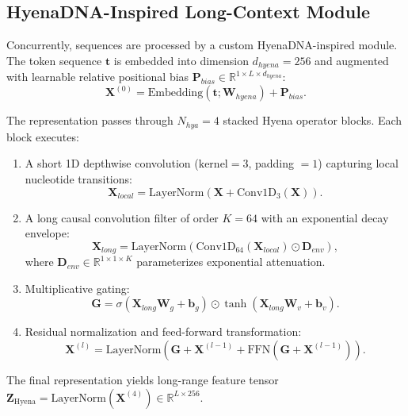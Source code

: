 \documentclass[conference]{IEEEtran}
\begin{document}
\subsection{HyenaDNA-Inspired Long-Context Module}
Concurrently, sequences are processed by a custom HyenaDNA-inspired module. The token sequence $\mathbf{t}$ is embedded into dimension $d_{hyena} = 256$ and augmented with learnable relative positional bias $\mathbf{P}_{bias} \in \mathbb{R}^{1 \times L \times d_{hyena}}$:
\begin{equation}
\mathbf{X}^{(0)} = \text{Embedding}(\mathbf{t}; \mathbf{W}_{hyena}) + \mathbf{P}_{bias}.
\label{eq:hyena_input}
\end{equation}

The representation passes through $N_{hya} = 4$ stacked Hyena operator blocks. Each block executes:
\begin{enumerate}
    \item A short 1D depthwise convolution ($\text{kernel} = 3$, padding $= 1$) capturing local nucleotide transitions:
    \begin{equation}
    \mathbf{X}_{local} = \text{LayerNorm}(\mathbf{X} + \text{Conv1D}_{3}(\mathbf{X})).
    \label{eq:short_conv}
    \end{equation}
    \item A long causal convolution filter of order $K = 64$ with an exponential decay envelope:
    \begin{equation}
    \mathbf{X}_{long} = \text{LayerNorm}(\text{Conv1D}_{64}(\mathbf{X}_{local}) \odot \mathbf{D}_{env}),
    \label{eq:long_filter}
    \end{equation}
    where $\mathbf{D}_{env} \in \mathbb{R}^{1 \times 1 \times K}$ parameterizes exponential attenuation.
    \item Multiplicative gating:
    \begin{equation}
    \mathbf{G} = \sigma(\mathbf{X}_{long} \mathbf{W}_g + \mathbf{b}_g) \odot \tanh(\mathbf{X}_{long} \mathbf{W}_v + \mathbf{b}_v).
    \label{eq:hyena_gate}
    \end{equation}
    \item Residual normalization and feed-forward transformation:
    \begin{equation}
    \mathbf{X}^{(l)} = \text{LayerNorm}(\mathbf{G} + \mathbf{X}^{(l-1)} + \text{FFN}(\mathbf{G} + \mathbf{X}^{(l-1)})).
    \label{eq:hyena_block_out}
    \end{equation}
\end{enumerate}
The final representation yields long-range feature tensor $\mathbf{Z}_{\text{Hyena}} = \text{LayerNorm}(\mathbf{X}^{(4)}) \in \mathbb{R}^{L \times 256}$.
\end{document}
